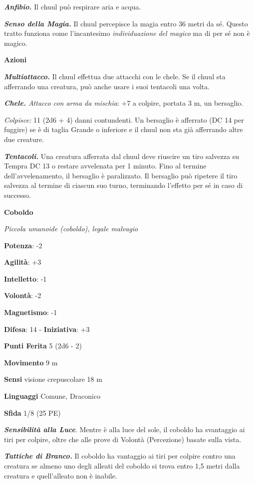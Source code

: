 \begin{multicols}{2}
\emph{\textbf{Anfibio.}} Il chuul può respirare aria e acqua.

\emph{\textbf{Senso della Magia.}} Il chuul percepisce la magia entro 36
metri da sé. Questo tratto funziona come l'incantesimo
\emph{individuazione} \emph{del magico} ma di per sé non è magico.

\textbf{Azioni}

\emph{\textbf{Multiattacco.}} Il chuul effettua due attacchi con le
chele. Se il chuul sta afferrando una creatura, può anche usare i suoi
tentacoli una volta.

\emph{\textbf{Chele.} Attacco con arma da mischia}: +7 a colpire,
portata 3 m, un bersaglio.

\emph{Colpisce:} 11 (2d6 + 4) danni contundenti. Un bersaglio è
afferrato (DC 14 per fuggire) se è di taglia Grande o inferiore e il
chuul non sta già afferrando altre due creature.

\emph{\textbf{Tentacoli.}} Una creatura afferrata dal chuul deve
riuscire un tiro salvezza su Tempra DC 13 o restare avvelenata per
1 minuto. Fino al termine dell'avvelenamento, il bersaglio è
paralizzato. Il bersaglio può ripetere il tiro salvezza al termine di
ciascun suo turno, terminando l'effetto per sé in caso di successo.

\textbf{Coboldo}

\emph{Piccola umanoide (coboldo), legale malvagio}

\textbf{Potenza}: -2

\textbf{Agilità}: +3

\textbf{Intelletto}: -1

\textbf{Volontà}: -2

\textbf{Magnetismo}: -1

\textbf{Difesa}: 14 - \textbf{Iniziativa}: +3

\textbf{Punti Ferita} 5 (2d6 - 2)

\textbf{Movimento} 9 m

\textbf{Sensi} visione crepuscolare 18 m

\textbf{Linguaggi} Comune, Draconico

\textbf{Sfida} 1/8 (25 PE)

\emph{\textbf{Sensibilità alla Luce}}. Mentre è alla luce del sole, il
coboldo ha svantaggio ai tiri per colpire, oltre che alle prove di
Volontà (Percezione) basate sulla vista.

\emph{\textbf{Tattiche di Branco.}} Il coboldo ha vantaggio ai tiri per
colpire contro una creatura se almeno uno degli alleati del coboldo si
trova entro 1,5 metri dalla creatura e quell'alleato non è inabile.


\end{multicols}
